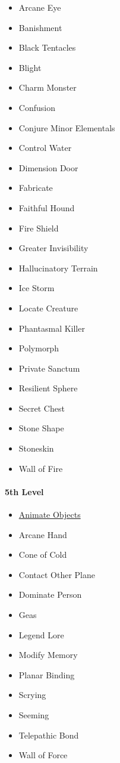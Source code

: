 \begin{itemize}
\item
  Arcane Eye
\item
  Banishment
\item
  Black Tentacles
\item
  Blight
\item
  Charm Monster
\item
  Confusion
\item
  Conjure Minor Elementals
\item
  Control Water
\item
  Dimension Door
\item
  Fabricate
\item
  Faithful Hound
\item
  Fire Shield
\item
  Greater Invisibility
\item
  Hallucinatory Terrain
\item
  Ice Storm
\item
  Locate Creature
\item
  Phantasmal Killer
\item
  Polymorph
\item
  Private Sanctum
\item
  Resilient Sphere
\item
  Secret Chest
\item
  Stone Shape
\item
  Stoneskin
\item
  Wall of Fire
\end{itemize}

\paragraph{5th Level}\label{_5th_level_2}

\begin{itemize}
\item
  \hyperref[spell-animate-objects]{Animate Objects}
\item
  Arcane Hand
\item
  Cone of Cold
\item
  Contact Other Plane
\item
  Dominate Person
\item
  Geas
\item
  Legend Lore
\item
  Modify Memory
\item
  Planar Binding
\item
  Scrying
\item
  Seeming
\item
  Telepathic Bond
\item
  Wall of Force
\end{itemize}

